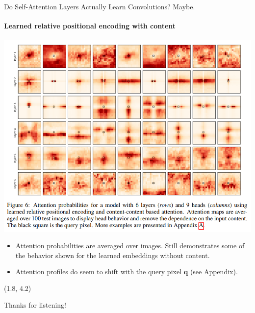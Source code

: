 \documentclass[9pt]{beamer}
\begin{document}
\begin{frame}{Do Self-Attention Layers Actually Learn Convolutions? Maybe.}
\framesubtitle{Learned relative positional encoding with content}
\begin{center}
    \includegraphics[width=.68\textwidth]{
        presentation/images/learned_rel_emb_content.png}
    \vspace{-.1in}
\end{center}
\begin{itemize}
\item Attention probabilities are averaged over images. Still demonstrates some of the behavior shown for the learned embeddings without content.

\vspace{-.1in}
\item Attention profiles do seem to shift with the query pixel $\bm q$ (see Appendix).
\end{itemize}
\end{frame}


\begin{frame}
\begin{textblock}{8}(1.8, 4.2) \raggedright \Huge 
    Thanks for listening!
\end{textblock}
\end{frame}
\usebackgroundtemplate{ } %
\end{document}

